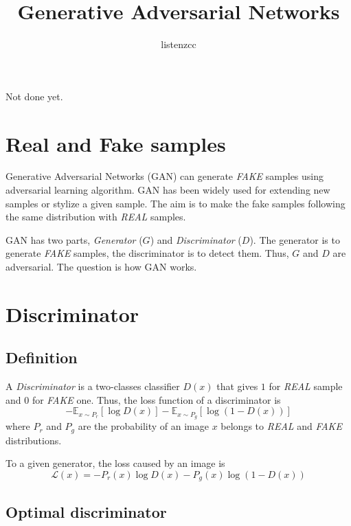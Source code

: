 \documentclass[a4paper]{article}
\title{Generative Adversarial Networks}
\author{listenzcc}
\begin{document}
\maketitle

\abstract
Not done yet.

\tableofcontents

\section{Real and Fake samples}
Generative Adversarial Networks (GAN) can generate \emph{FAKE} samples using adversarial learning algorithm.
GAN has been widely used for extending new samples or stylize a given sample.
The aim is to make the fake samples following the same distribution with \emph{REAL} samples.

GAN has two parts, \emph{Generator} ($G$) and \emph{Discriminator} ($D$).
The generator is to generate \emph{FAKE} samples, the discriminator is to detect them.
Thus, $G$ and $D$ are adversarial.
The question is how GAN works.

\section{Discriminator}

\subsection{Definition}

A \emph{Discriminator} is a two-classes classifier $D(x)$ that gives $1$ for \emph{REAL} sample and $0$ for \emph{FAKE} one.
Thus, the loss function of a discriminator is
\begin{equation} \label{eq:D_loss}
    - \mathbb{E}_{x\sim P_r} [\log{D(x)}]
    - \mathbb{E}_{x\sim P_g} [\log{(1-D(x))}]
\end{equation}
where $P_r$ and $P_g$ are the probability of an image $x$ belongs to \emph{REAL} and \emph{FAKE} distributions.

To a given generator, the loss caused by an image is
\begin{equation}
    \mathcal{L}{(x)} =
    - P_r(x) \log{D(x)}
    - P_g(x) \log{(1-D(x))}
\end{equation}

\subsection{Optimal discriminator}
\end{document}
